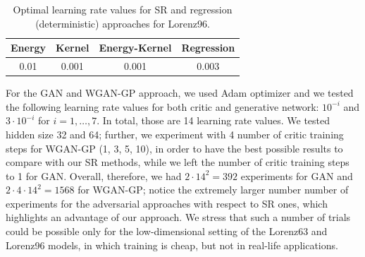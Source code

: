 \documentclass[twoside,11pt]{article}
\begin{document}
	\begin{table}
		\begin{center}
			\begin{tabular}{cccc}
				\toprule
				Energy & Kernel & Energy-Kernel & Regression \\
				\midrule
				0.01  & 0.001 & 0.001 & 0.003 \\
				\bottomrule
			\end{tabular}
		\end{center}
		\caption{Optimal learning rate values for SR and regression (deterministic) approaches for Lorenz96.}
		\label{tab:lr_lorenz96_SR}
	\end{table}
	
	
	
	
	
	For the GAN and WGAN-GP approach, we used Adam optimizer and we tested the following learning rate values for both critic and generative network: $ 10^{-i} $ and $ 3\cdot 10^{-i} $ for $ i=1,\ldots, 7$. In total, those are 14 learning rate values. 
	We tested hidden size 32 and 64; further, we experiment with 4 number of critic training steps for WGAN-GP (1, 3, 5, 10), in order to have the best possible results to compare with our SR methods, while we left the number of critic training steps to 1 for GAN. Overall, therefore, we had $ 2\cdot 14^2  = 392$ experiments for GAN and  $ 2\cdot 4 \cdot 14^2  = 1568$ for WGAN-GP; notice the extremely larger number number of experiments for the adversarial approaches with respect to SR ones, which highlights an advantage of our approach. We stress that such a number of trials could be possible only for the low-dimensional setting of the Lorenz63 and Lorenz96 models, in which training is cheap, but not in real-life applications.
	
\end{document}
